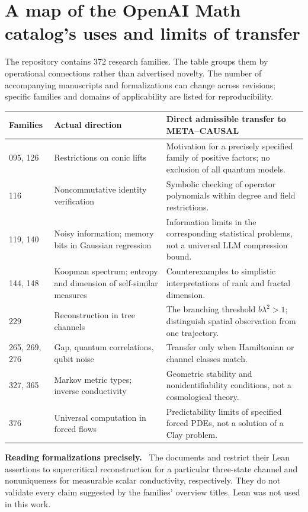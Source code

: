 \documentclass[11pt,a4paper,oneside]{book}
\newcommand{\note}[1]{\par\medskip\noindent\textbf{#1}\ }
\begin{document}
\section{A map of the OpenAI Math catalog's uses and limits of transfer}
The  repository contains 372 research families. The table groups them by operational connections rather than advertised novelty. The number of accompanying manuscripts and formalizations can change across revisions; specific families and domains of applicability are listed for reproducibility.
\begin{longtable}{p{}p{}p{}}
\toprule Families&Actual direction&Direct admissible transfer to META--CAUSAL\\\midrule
095, 126&Restrictions on conic lifts&Motivation for a precisely specified family of positive factors; no exclusion of all quantum models.\\
116&Noncommutative identity verification&Symbolic checking of operator polynomials within degree and field restrictions.\\
119, 140&Noisy information; memory bits in Gaussian regression&Information limits in the corresponding statistical problems, not a universal LLM compression bound.\\
144, 148&Koopman spectrum; entropy and dimension of self-similar measures&Counterexamples to simplistic interpretations of rank and fractal dimension.\\
229&Reconstruction in tree channels&The branching threshold $b\lambda^2>1$; distinguish spatial observation from one trajectory.\\
265, 269, 276&Gap, quantum correlations, qubit noise&Transfer only when Hamiltonian or channel classes match.\\
327, 365&Markov metric types; inverse conductivity&Geometric stability and nonidentifiability conditions, not a cosmological theory.\\
376&Universal computation in forced flows&Predictability limits of specified forced PDEs, not a solution of a Clay problem.\\\bottomrule
\end{longtable}
\note{Reading formalizations precisely.} The documents  and  restrict their Lean assertions to supercritical reconstruction for a particular three-state channel and nonuniqueness for measurable scalar conductivity, respectively. They do not validate every claim suggested by the families' overview titles. Lean was not used in this work.
\end{document}
